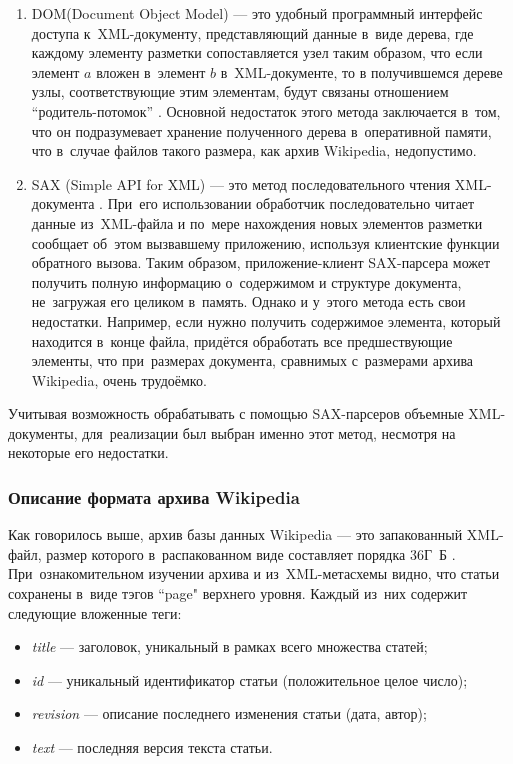 \begin{enumerate}

\item{
DOM(Document Object Model) --- 
это удобный программный интерфейс доступа к~XML-документу, 
представляющий данные в~виде дерева, где каждому элементу разметки сопоставляется узел таким образом, 
что если элемент $a$ вложен в~элемент $b$ в~XML-документе, то в получившемся дереве узлы, соответствующие этим элементам, 
будут связаны отношением ``родитель-потомок'' \cite{dom} .
Основной недостаток этого метода заключается в~том, что он подразумевает хранение полученного дерева в~оперативной памяти, 
что в~случае файлов такого размера, как архив Wikipedia, недопустимо.
}

\item {
SAX (Simple API for XML) --- 
это метод последовательного чтения XML-документа \cite{sax}. 
При~его использовании обработчик последовательно читает данные из~XML-файла и по~мере нахождения новых элементов разметки сообщает об~этом вызвавшему приложению, 
используя клиентские функции обратного вызова\cite{callback}. 
Таким образом, приложение-клиент SAX-парсера может получить полную информацию о~содержимом и структуре документа,
не~загружая его целиком в~память. 
Однако и у~этого метода есть свои недостатки. 
Например, если нужно получить содержимое элемента, который находится в~конце файла, придётся обработать все предшествующие элементы, 
что при~размерах документа, сравнимых с~размерами архива  Wikipedia, 
очень трудоёмко.

}

\end{enumerate}

Учитывая возможность обрабатывать с помощью SAX-парсеров объемные XML-документы, 
для~реализации был выбран именно этот метод, несмотря на некоторые его недостатки.

\subsubsection{Описание формата архива Wikipedia}

Как говорилось выше, архив  базы данных Wikipedia --- это запакованный XML-файл, 
размер которого в~распакованном виде составляет порядка 36Г~Б \cite{dump}.
При~ознакомительном изучении архива и из~XML-метасхемы \cite{schema} видно, 
что статьи сохранены в~виде тэгов ``page" верхнего уровня. 
Каждый из~них содержит следующие вложенные теги:

\begin{itemize}
\item{{\it title} --- заголовок, уникальный в рамках всего множества статей;}
\item{{\it id} --- уникальный идентификатор статьи (положительное целое число);}
\item{{\it revision} --- описание последнего изменения статьи (дата, автор);}
\item{{\it text} --- последняя версия текста статьи.}
\end{itemize}

